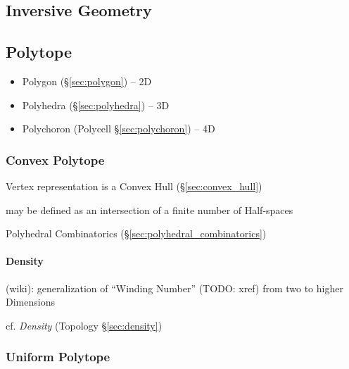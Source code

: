 \subsection{Inversive Geometry}\label{sec:inversive_geometry}

\subsection{Polytope}\label{sec:polytope}

\begin{itemize}
  \item Polygon (\S\ref{sec:polygon}) -- 2D
  \item Polyhedra (\S\ref{sec:polyhedra}) -- 3D
  \item Polychoron (Polycell \S\ref{sec:polychoron}) -- 4D
\end{itemize}



\subsubsection{Convex Polytope}\label{sec:convex_polytope}

Vertex representation is a Convex Hull (\S\ref{sec:convex_hull})

may be defined as an intersection of a finite number of Half-spaces

\fist Polyhedral Combinatorics (\S\ref{sec:polyhedral_combinatorics})



\paragraph{Density}\label{sec:polytope_density}\hfill

(wiki): generalization of ``Winding Number'' (TODO: xref) from two to higher
Dimensions

cf. \emph{Density} (Topology \S\ref{sec:density})



\subsubsection{Uniform Polytope}\label{sec:uniform_polytope}

